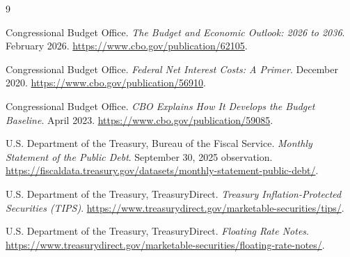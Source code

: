\documentclass[10pt]{article}
\begin{document}
\begin{thebibliography}{9}

Congressional Budget Office.
\emph{The Budget and Economic Outlook: 2026 to 2036}.
February 2026.
\url{https://www.cbo.gov/publication/62105}.

Congressional Budget Office.
\emph{Federal Net Interest Costs: A Primer}.
December 2020.
\url{https://www.cbo.gov/publication/56910}.

Congressional Budget Office.
\emph{CBO Explains How It Develops the Budget Baseline}.
April 2023.
\url{https://www.cbo.gov/publication/59085}.

U.S. Department of the Treasury, Bureau of the Fiscal Service.
\emph{Monthly Statement of the Public Debt}.
September 30, 2025 observation.
\url{https://fiscaldata.treasury.gov/datasets/monthly-statement-public-debt/}.

U.S. Department of the Treasury, TreasuryDirect.
\emph{Treasury Inflation-Protected Securities (TIPS)}.
\url{https://www.treasurydirect.gov/marketable-securities/tips/}.

U.S. Department of the Treasury, TreasuryDirect.
\emph{Floating Rate Notes}.
\url{https://www.treasurydirect.gov/marketable-securities/floating-rate-notes/}.

\end{thebibliography}
\end{document}
